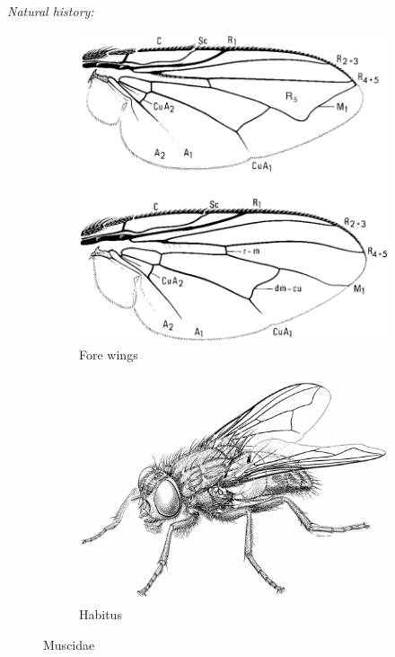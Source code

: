 \documentclass[letterpaper, 11pt]{article}
\begin{document}
\noindent{}\textit{Natural history:} \\

\begin{figure}[ht!]
    \centering
    \begin{subfigure}[ht!]{0.4\textwidth}
        \includegraphics[width=\textwidth]{MuscidWings}
        \caption{Fore wings \citep[][Fig. 105.22,24]{mcalpine1981manualv2}}
        \label{fig:muscid1}
    \end{subfigure}
    \qquad
    \begin{subfigure}[ht!]{0.45\textwidth}
        \includegraphics[width=\textwidth]{MuscidHabitus}
        \caption{Habitus \citep[][Fig. 105.1]{mcalpine1981manualv2}}
        \label{fig:muscid2}
    \end{subfigure}
    \caption{Muscidae}\label{fig:muscids}
\end{figure}
\end{document}
